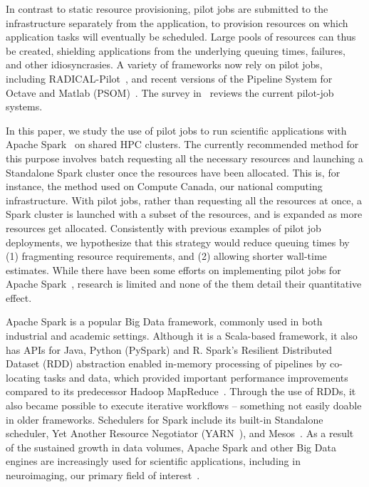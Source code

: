     In contrast to static resource provisioning, pilot jobs are submitted to
    the infrastructure separately from the application, to provision resources
    on which application tasks will eventually be scheduled. Large pools of
    resources can thus be created, shielding applications from the underlying
    queuing times, failures, and other idiosyncrasies. A variety of frameworks
    now rely on pilot jobs, including RADICAL-Pilot~\cite{merzky2015radical},
    and recent versions of the Pipeline System for Octave and Matlab
    (PSOM)~\cite{bellec2012pipeline}. The survey in~\cite{turilli2018comprehensive} reviews
    the current pilot-job systems.
    
    In this paper, we study the use of pilot jobs to run scientific
    applications with Apache Spark~\cite{zaharia2016apache} on shared HPC
    clusters. The currently recommended method for this purpose involves batch
    requesting all the
    necessary resources and launching a Standalone Spark cluster once the
    resources have been allocated. This is, for instance, the method used on
    Compute Canada,
     our national computing infrastructure. With pilot
    jobs, rather than requesting all the resources at once, a Spark cluster is
    launched with a subset of the resources, and is expanded as more resources
    get allocated. Consistently with previous examples of pilot job
    deployments, we hypothesize that this strategy would reduce queuing times
    by (1) fragmenting resource requirements, and (2) allowing shorter wall-time
    estimates. While there have been some efforts on implementing pilot jobs
    for Apache Spark~\cite{luckow2016hadoop}, research is limited and
    none of the them detail their quantitative effect.
    
    Apache Spark is a popular Big Data framework, commonly used in both
    industrial and academic settings. Although it is a Scala-based framework,
    it also has APIs for Java, Python (PySpark) and R. Spark's Resilient
    Distributed Dataset (RDD) abstraction enabled in-memory processing of
    pipelines by co-locating tasks and data, which provided important
    performance improvements compared to its predecessor Hadoop
    MapReduce~\cite{dean2008mapreduce}. Through the use of RDDs, it also became possible
    to execute iterative workflows -- something not easily doable in older
    frameworks. Schedulers for Spark include its built-in Standalone scheduler,
    Yet Another Resource Negotiator (YARN~\cite{apache13yet}), and Mesos~\cite{hindman2011mesos}. As a
    result of the sustained growth in data volumes, Apache Spark and other
    Big Data engines are increasingly used for scientific applications,
    including in neuroimaging, our primary field of
    interest~\cite{boubela2016big,mehta2017comparative,freeman2014mapping}.
    
